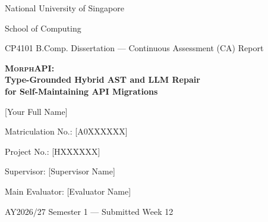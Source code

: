 \documentclass[11pt,a4paper]{article}
\newcommand{\morph}{\textsc{MorphAPI}}
\begin{document}
\begin{titlepage}
\centering
\vspace*{1.2cm}
{\large National University of Singapore\par}
{\large School of Computing\par}
\vspace{0.4cm}
{\normalsize CP4101 B.Comp. Dissertation --- Continuous Assessment (CA) Report\par}
\vspace{1.8cm}
{\LARGE\bfseries \morph{}:\\[0.3em] Type-Grounded Hybrid AST and LLM Repair\\[0.2em] for Self-Maintaining API Migrations\par}
\vspace{1.6cm}
{\large [Your Full Name]\par}
{\normalsize Matriculation No.: [A0XXXXXX]\par}
\vspace{1.2cm}
{\normalsize Project No.: [HXXXXXX]\par}
{\normalsize Supervisor: [Supervisor Name]\par}
{\normalsize Main Evaluator: [Evaluator Name]\par}
\vfill
{\normalsize AY2026/27 Semester 1 \quad --- \quad Submitted Week 12\par}
\vspace{1.2cm}


\end{titlepage}
\end{document}
